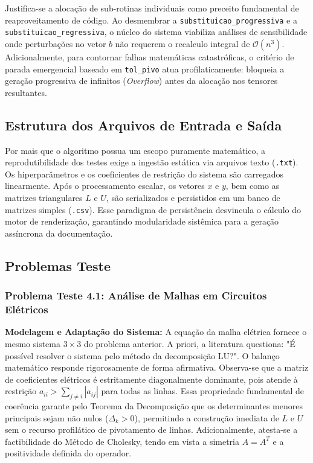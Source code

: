 Justifica-se a alocação de sub-rotinas individuais como preceito fundamental de reaproveitamento de código. Ao desmembrar a \texttt{substituicao\_progressiva} e a \texttt{substituicao\_regressiva}, o núcleo do sistema viabiliza análises de sensibilidade onde perturbações no vetor $b$ não requerem o recalculo integral de $\mathcal{O}(n^3)$. Adicionalmente, para contornar falhas matemáticas catastróficas, o critério de parada emergencial baseado em \texttt{tol\_pivo} atua profilaticamente: bloqueia a geração progressiva de infinitos (\textit{Overflow}) antes da alocação nos tensores resultantes.

\subsection{Estrutura dos Arquivos de Entrada e Saída}

Por mais que o algoritmo possua um escopo puramente matemático, a reprodutibilidade dos testes exige a ingestão estática via arquivos texto (\texttt{.txt}). Os hiperparâmetros e os coeficientes de restrição do sistema são carregados linearmente. Após o processamento escalar, os vetores $x$ e $y$, bem como as matrizes triangulares $L$ e $U$, são serializados e persistidos em um banco de matrizes simples (\texttt{.csv}). Esse paradigma de persistência desvincula o cálculo do motor de renderização, garantindo modularidade sistêmica para a geração assíncrona da documentação.

\subsection{Problemas Teste}

\subsubsection{Problema Teste 4.1: Análise de Malhas em Circuitos Elétricos}

\textbf{Modelagem e Adaptação do Sistema:} A equação da malha elétrica fornece o mesmo sistema $3 \times 3$ do problema anterior. A priori, a literatura questiona: "É possível resolver o sistema pelo método da decomposição LU?". O balanço matemático responde rigorosamente de forma afirmativa. Observa-se que a matriz de coeficientes elétricos é estritamente diagonalmente dominante, pois atende à restrição $a_{ii} > \sum_{j \neq i} |a_{ij}|$ para todas as linhas. Essa propriedade fundamental de coerência garante pelo Teorema da Decomposição que os determinantes menores principais sejam não nulos ($\Delta_k > 0$), permitindo a construção imediata de $L$ e $U$ sem o recurso profilático de pivotamento de linhas. Adicionalmente, atesta-se a factibilidade do Método de Cholesky, tendo em vista a simetria $A=A^T$ e a positividade definida do operador.

